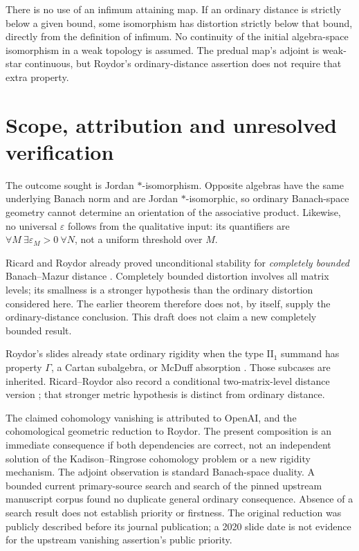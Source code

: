 \documentclass[11pt]{article}
\begin{document}
There is no use of an infimum attaining map. If an ordinary distance
is strictly below a given bound, some isomorphism has distortion
strictly below that bound, directly from the definition of infimum.
No continuity of the initial algebra-space isomorphism in a weak
topology is assumed. The predual map's adjoint is weak-star
continuous, but Roydor's ordinary-distance assertion does not require
that extra property.

\section{Scope, attribution and unresolved verification}

The outcome sought is Jordan $*$-isomorphism. Opposite algebras have
the same underlying Banach norm and are Jordan $*$-isomorphic, so
ordinary Banach-space geometry cannot determine an orientation of the
associative product. Likewise, no universal $\varepsilon$ follows from
the qualitative input: its quantifiers are $\forall M\ \exists
\varepsilon_M>0\ \forall N$, not a uniform threshold over $M$.

Ricard and Roydor already proved unconditional stability for
\emph{completely bounded} Banach--Mazur distance
\cite[Theorem A]{RicardRoydor}. Completely bounded distortion involves
all matrix levels; its smallness is a stronger hypothesis than the
ordinary distortion considered here. The earlier theorem therefore
does not, by itself, supply the ordinary-distance conclusion.
This draft does not claim a new completely bounded result.

Roydor's slides already state ordinary rigidity when the type
$\mathrm{II}_1$ summand has property $\Gamma$, a Cartan subalgebra,
or McDuff absorption \cite[PDF pp.~47--48]{RoydorSlides}. Those
subcases are inherited. Ricard--Roydor also record a conditional
two-matrix-level distance version \cite[Remark 3.7]{RicardRoydor};
that stronger metric hypothesis is distinct from ordinary distance.

The claimed cohomology vanishing is attributed to OpenAI, and the
cohomological geometric reduction to Roydor. The present composition
is an immediate consequence if both dependencies are correct, not
an independent solution of the Kadison--Ringrose cohomology problem
or a new rigidity mechanism. The adjoint observation is standard
Banach-space duality. A bounded current primary-source search and
search of the pinned upstream manuscript corpus found no duplicate
general ordinary consequence. Absence of a search result does not
establish priority or firstness. The original reduction was publicly
described before its journal publication; a 2020 slide date is not
evidence for the upstream vanishing assertion's public priority.
\end{document}
